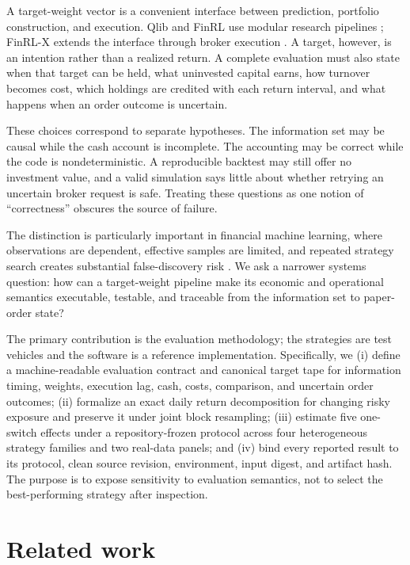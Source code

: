 \documentclass{article}
\begin{document}
A target-weight vector is a convenient interface between prediction, portfolio
construction, and execution. Qlib and FinRL use modular research pipelines
\citep{yang2020qlib,liu2020finrl}; FinRL-X extends the interface through broker
execution \citep{yang2026finrlx}. A target, however, is an intention rather
than a realized return. A complete evaluation must also state when that target
can be held, what uninvested capital earns, how turnover becomes cost, which
holdings are credited with each return interval, and what happens when an order
outcome is uncertain.

These choices correspond to separate hypotheses. The information set may be
causal while the cash account is incomplete. The accounting may be correct
while the code is nondeterministic. A reproducible backtest may still offer no
investment value, and a valid simulation says little about whether retrying an
uncertain broker request is safe. Treating these questions as one notion of
``correctness'' obscures the source of failure.

The distinction is particularly important in financial machine learning,
where observations are dependent, effective samples are limited, and repeated
strategy search creates substantial false-discovery risk
\citep{white2000reality,harvey2016crosssection,bailey2014deflated,
bailey2017pbo,arnott2019protocol}. We ask a narrower systems question: how can a
target-weight pipeline make its economic and operational semantics executable,
testable, and traceable from the information set to paper-order state?

The primary contribution is the evaluation methodology; the strategies are test
vehicles and the software is a reference implementation. Specifically, we
(i) define a machine-readable evaluation contract and canonical target tape for
information timing, weights, execution lag, cash, costs, comparison, and
uncertain order outcomes; (ii) formalize an exact daily return decomposition for
changing risky exposure and preserve it under joint block resampling; (iii)
estimate five one-switch effects under a repository-frozen protocol across four
heterogeneous strategy families and two real-data panels; and (iv) bind every
reported result to its protocol, clean source revision, environment, input
digest, and artifact hash. The purpose is to expose sensitivity to evaluation
semantics, not to select the best-performing strategy after inspection.

\section{Related work}
\end{document}
